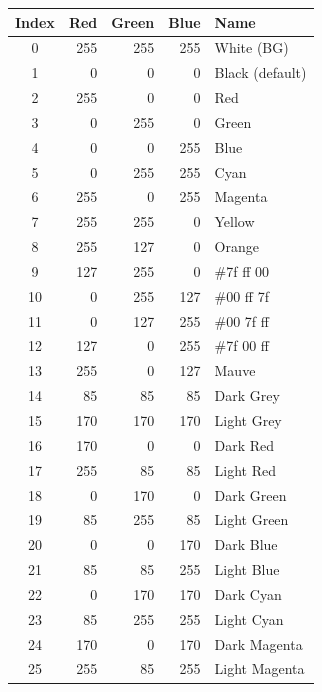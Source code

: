 \documentclass[11pt,twoside,english]{article}
\begin{document}
\begin{description}
\begin{description}
\begin{table}[!ht]
      \begin{center}
        \begin{tabular}{|c|rrr|l|}
          \hline 
          Index&      Red&      Green&      Blue&      Name\\
          \hline 
          0&      255&      255&      255&      White (BG)\\
          1&      0&      0&      0&      Black (default)\\
          2&      255&      0&      0&      Red\\
          3&      0&      255&      0&      Green\\
          4&      0&      0&      255&      Blue\\
          5&      0&      255&      255&      Cyan\\
          6&      255&      0&      255&      Magenta\\
          7&      255&      255&      0&      Yellow\\
          8&      255&      127&      0&      Orange\\
          9&      127&      255&      0&      \#7f ff 00\\
          10&      0&      255&      127&     \#00 ff 7f \\
          11&      0&      127&      255&    \#00 7f ff \\
          12&      127&      0&      255&     \#7f 00 ff \\
          13&      255&      0&      127&      Mauve\\
          14&      85&      85&      85&      Dark Grey\\
          15&      170&      170&      170&      Light Grey\\
          16 & 170 & 0 & 0 & Dark Red\\
          17 & 255 & 85 & 85 & Light Red\\
          18 & 0 & 170 & 0 & Dark Green\\
          19 & 85 & 255 & 85 & Light Green\\
          20 & 0 & 0 & 170 & Dark Blue\\
          21 & 85 & 85 & 255 & Light Blue\\
          22 & 0 & 170 & 170 & Dark Cyan\\
          23 & 85 & 255 & 255 & Light Cyan\\
          24 & 170 & 0 & 170 & Dark Magenta\\
          25 & 255 & 85 & 255 & Light Magenta\\

\end{tabular}
\end{center}
\end{table}
\end{description}
\end{description}
\end{document}
